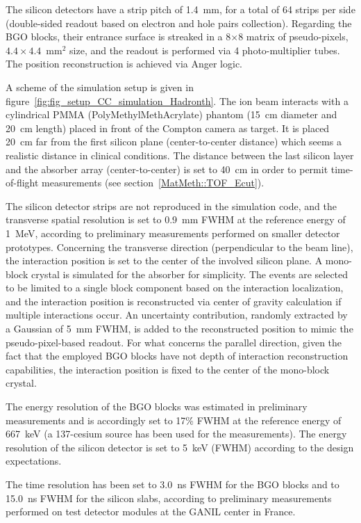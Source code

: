 The silicon detectors have a strip pitch of 1.4~mm, for a total of 64 strips per side (double-sided readout based on electron and hole pairs collection). 
Regarding the BGO blocks, their entrance surface is streaked in a 8$\times$8 matrix of pseudo-pixels, $4.4\times4.4$~mm$^{2}$ size, and the readout is performed via 4 photo-multiplier tubes. The position reconstruction is achieved via Anger logic.

A scheme of the simulation setup is given in figure~\ref{fig:fig_setup_CC_simulation_Hadronth}. The ion beam interacts with a cylindrical PMMA (PolyMethylMethAcrylate) phantom (15~cm diameter and 20~cm length) placed in front of the Compton camera as target. It is placed 20~cm far from the first silicon plane (center-to-center distance) which seems a realistic distance in clinical conditions. The distance between the last silicon layer and the absorber array (center-to-center) is set to 40~cm in order to permit time-of-flight measurements (see section~\ref{MatMeth::TOF_Ecut}).

The silicon detector strips are not reproduced in the simulation code, and the transverse spatial resolution is set to 0.9~mm FWHM at the reference energy of 1~MeV, according to preliminary measurements performed on smaller detector prototypes. Concerning the transverse direction (perpendicular to the beam line), the interaction position is set to the center of the involved silicon plane. A mono-block crystal is simulated for the absorber for simplicity. The events are selected to be limited to a single block component based on the interaction localization, and the interaction position is reconstructed via center of gravity calculation if multiple interactions occur. An uncertainty contribution, randomly extracted by a Gaussian of 5~mm FWHM, is added to the reconstructed position to mimic the pseudo-pixel-based readout. For what concerns the parallel direction, given the fact that the employed BGO blocks have not depth of interaction reconstruction capabilities, the interaction position is fixed to the center of the mono-block crystal.

The energy resolution of the BGO blocks was estimated in preliminary measurements and is accordingly set to 17\% FWHM at the reference energy of 667~keV (a 137-cesium source has been used for the measurements). The energy resolution of the silicon detector is set to 5~keV (FWHM) according to the design expectations.

The time resolution has been set to 3.0~ns FWHM for the BGO blocks and to 15.0~ns FWHM for the silicon slabs, according to preliminary measurements performed on test detector modules at the GANIL %
center in France.

